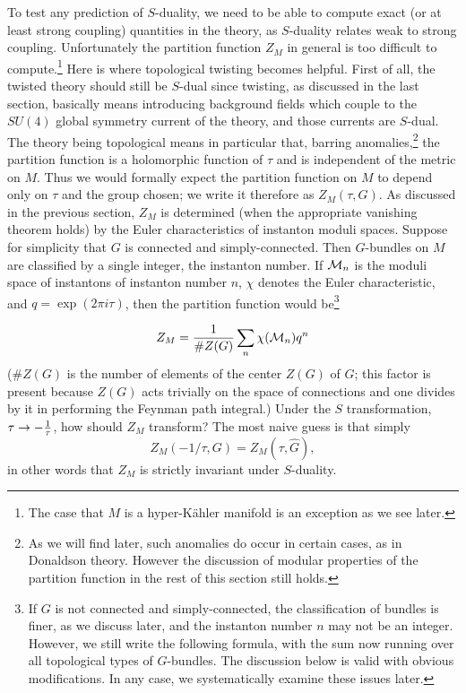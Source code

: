 \documentclass[12pt]{article}
\numberwithin{equation}{section}
\begin{document}
To test any prediction of $S$-duality, we need to be able
to compute exact (or at least strong coupling)
quantities in the theory, as $S$-duality
relates weak to strong coupling.
Unfortunately the partition function $Z_M$
in general is too difficult to compute.\footnote{The case that $M$ is
a hyper-K\"ahler manifold is an exception as we see later.}
Here is where topological twisting
becomes helpful.  First of all, the twisted theory should
still be $S$-dual
since twisting, as discussed in the last section,
basically means introducing background
fields which couple to  the $SU(4)$ global symmetry
current
of the theory, and those currents are $S$-dual.
The theory
being topological means in particular that,
barring anomalies,\footnote{As we will find later, such anomalies do
  occur in certain cases, as in Donaldson theory. However the
  discussion of modular properties of the partition function in the
rest of this section still holds.}
the partition function
is a holomorphic function of $\tau$ and is independent of the metric
on $M$.  Thus we would formally expect the
partition function on $M$ to depend only on
$\tau$ and the group chosen; we write it therefore as $Z_M(\tau, G)$.
As discussed in the previous section, $Z_M$ is determined
(when the appropriate vanishing theorem holds) by the Euler
characteristics of instanton moduli spaces.
Suppose for simplicity that $G$ is connected and simply-connected.
Then $G$-bundles on $M$ are classified by a single integer, the instanton
number.
If ${\cal M}_n$ is the
moduli space of instantons of instanton number $n$, $\chi$
denotes the Euler characteristic, and $q=\exp(2\pi i\tau)$,
then the partition function would be\footnote{If $G$ is not connected
  and simply-connected, the classification of bundles is finer, as we
  discuss later, and the instanton number $n$ may not be an integer.
  However, we still write the following formula, with the sum now
  running over all topological types of $G$-bundles.  The discussion
  below is valid with obvious modifications. In any case, we
systematically examine these issues later.}

%
\begin{equation}
  \label{minssum}
  Z_M={1\over \#Z(G)}\sum_n\chi({\cal M}_n) q^n
\end{equation}
%
($\#Z(G)$ is the number of elements of the center $Z(G)$ of $G$;
  this factor is present because $Z(G)$ acts trivially on the space
  of connections and one divides by it in performing the Feynman path
integral.)
Under the $S$ transformation,
$\tau \rightarrow -{1\over \tau}$, how should $Z_M$ transform?
The most naive
guess is that simply
%
$$Z_M(-1/\tau, G)=Z_M (\tau,{\widehat G}),$$
%
in other words that $Z_M$ is strictly invariant under $S$-duality.
\end{document}
